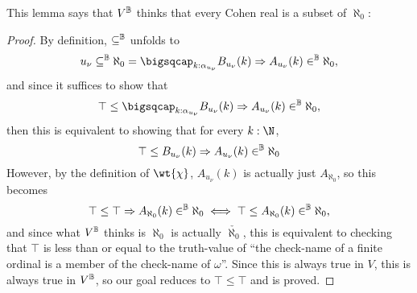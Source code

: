 \documentclass[11pt]{article}
\begin{document}
This lemma says that $V^{\mathbb{B}}$ thinks that every Cohen real is a subset of $\aleph_0$:
\begin{proof}
  By definition, $\subseteq^{\mathbb{B}}$ unfolds to
  $$
u_{\nu} \subseteq^\B \aleph_0= \bigsqcap_{k : \alpha_{u_{\nu}}} B_{u_{\nu}}(k) \Rightarrow A_{u_{\nu}}(k) \in^\B \aleph_0,
$$
and since it suffices to show that
$$
\top \leq \bigsqcap_{k : \alpha_{u_{\nu}}} B_{u_{\nu}}(k) \Rightarrow A_{u_{\nu}}(k) \in^\B \aleph_0,
$$
then this is equivalent to showing that for every $k : \N$,
$$
\top \leq B_{u_{\nu}}(k) \Rightarrow A_{u_{\nu}}(k) \in^{\mathbb{B}} \aleph_0
$$
However, by the definition of $\wt{\chi}$, $A_{u_{\nu}}(k)$ is actually just $A_{\aleph_0}$, so this becomes
$$
\top \leq \top \Rightarrow A_{\aleph_0}(k) \in^{\mathbb{B}} \aleph_0 \iff \top \leq A_{\aleph_0}(k) \in^{\mathbb{B}} \aleph_0,
$$
and since what $V^{\mathbb{B}}$ thinks is $\aleph_0$ is actually $\check{\aleph_0}$, this is equivalent to checking that $\top$ is less than or equal to the truth-value of ``the check-name of a finite ordinal is a member of the check-name of $\omega$''. Since this is always true in $V$, this is always true in $V^{\mathbb{B}}$, so our goal reduces to $\top \leq \top$ and is proved.
\end{proof}
\end{document}
